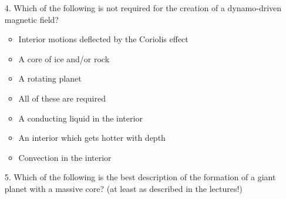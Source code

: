 \begin{enumerate}

\item[4.] Which of the following is not required for the creation of a dynamo-driven magnetic field?
    \begin{multicols}{2}
    \begin{itemize}[label={$\bullet$}]
        \item Interior motions deflected by the Coriolis effect
        \item A core of ice and/or rock
        \item A rotating planet
        \item All of these are required
        \item A conducting liquid in the interior
        \item An interior which gets hotter with depth
        \item Convection in the interior
    \end{itemize}
\end{multicols}

\item[5.] Which of the following is the best description of the formation of a giant planet with a massive core? (at least as described in the lectures!)
    

\end{enumerate}
